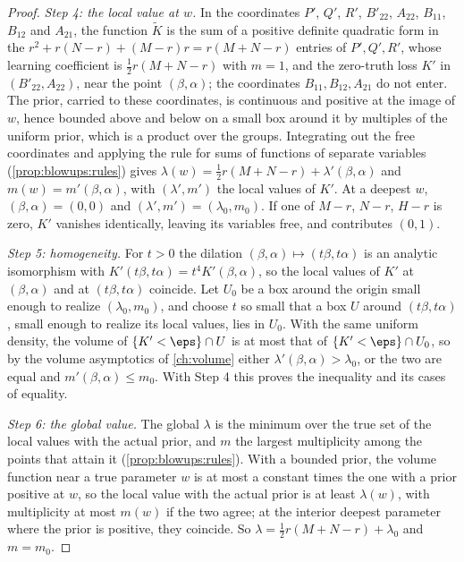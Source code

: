 \begin{refsection}
\begin{proof}
\emph{Step 4: the local value at $w$.} In the coordinates $P'$, $Q'$, $R'$, $B'_{22}$, $A_{22}$, $B_{11}$, $B_{12}$ and $A_{21}$, the function $\tilde K$ is the sum of a positive definite quadratic form in the $r^2+r(N-r)+(M-r)r=r(M+N-r)$ entries of $P',Q',R'$, whose learning coefficient is $\frac12r(M+N-r)$ with $m=1$, and the zero-truth loss $K'$ in $(B'_{22},A_{22})$, near the point $(\beta,\alpha)$; the coordinates $B_{11},B_{12},A_{21}$ do not enter. The prior, carried to these coordinates, is continuous and positive at the image of $w$, hence bounded above and below on a small box around it by multiples of the uniform prior, which is a product over the groups. Integrating out the free coordinates and applying the rule for sums of functions of separate variables (\cref{prop:blowups:rules}) gives $\lambda(w)=\tfrac12r(M+N-r)+\lambda'(\beta,\alpha)$ and $m(w)=m'(\beta,\alpha)$, with $(\lambda',m')$ the local values of $K'$. At a deepest $w$, $(\beta,\alpha)=(0,0)$ and $(\lambda',m')=(\lambda_0,m_0)$. If one of $M-r$, $N-r$, $H-r$ is zero, $K'$ vanishes identically, leaving its variables free, and contributes $(0,1)$.

\emph{Step 5: homogeneity.} For $t>0$ the dilation $(\beta,\alpha)\mapsto(t\beta,t\alpha)$ is an analytic isomorphism with $K'(t\beta,t\alpha)=t^4K'(\beta,\alpha)$, so the local values of $K'$ at $(\beta,\alpha)$ and at $(t\beta,t\alpha)$ coincide. Let $U_0$ be a box around the origin small enough to realize $(\lambda_0,m_0)$, and choose $t$ so small that a box $U$ around $(t\beta,t\alpha)$, small enough to realize its local values, lies in $U_0$. With the same uniform density, the volume of $\{K'<\eps\}\cap U$ is at most that of $\{K'<\eps\}\cap U_0$, so by the volume asymptotics of \cref{ch:volume} either $\lambda'(\beta,\alpha)>\lambda_0$, or the two are equal and $m'(\beta,\alpha)\le m_0$. With Step 4 this proves the inequality and its cases of equality.

\emph{Step 6: the global value.} The global $\lambda$ is the minimum over the true set of the local values with the actual prior, and $m$ the largest multiplicity among the points that attain it (\cref{prop:blowups:rules}). With a bounded prior, the volume function near a true parameter $w$ is at most a constant times the one with a prior positive at $w$, so the local value with the actual prior is at least $\lambda(w)$, with multiplicity at most $m(w)$ if the two agree; at the interior deepest parameter where the prior is positive, they coincide. So $\lambda=\frac12r(M+N-r)+\lambda_0$ and $m=m_0$.
\end{proof}


\end{refsection}
